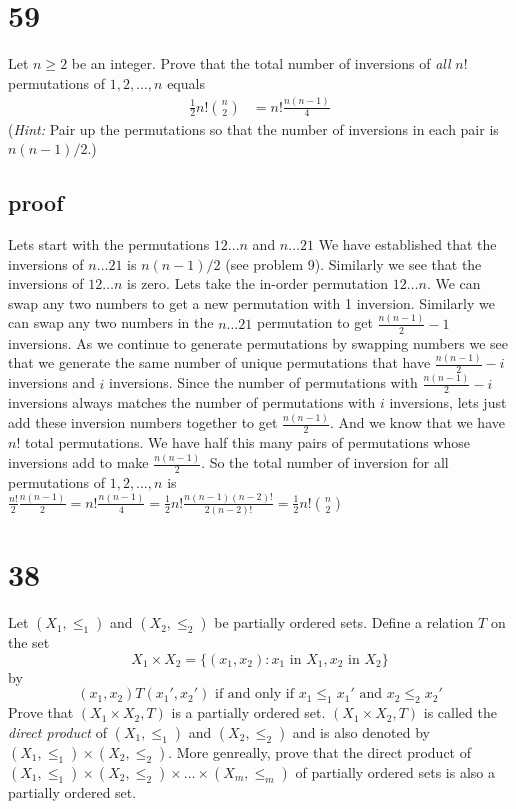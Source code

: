 \documentclass{article}
\begin{document}
\section*{59}
Let $n\geq2$ be an integer. Prove that the total number of inversions of \emph{all} $n!$ permutations of $1,2,\dots,n$ equals
\begin{align*}
  \frac{1}{2}n!\binom{n}{2}&=n!\frac{n(n-1)}{4}
\end{align*}
(\emph{Hint:} Pair up the permutations so that the number of inversions in each pair is $n(n-1)/2$.)
\subsection*{proof}
Lets start with the permutations $12\dots n$ and $n\dots21$ We have established that the inversions of $n\dots21$ is $n(n-1)/2$ (see problem 9). Similarly we see that the inversions of $12\dots n$ is zero. Lets take the in-order permutation $12\dots n$. We can swap any two numbers to get a new permutation with 1 inversion. Similarly we can swap any two numbers in the $n\dots21$ permutation to get $\frac{n(n-1)}{2}-1$ inversions. As we continue to generate permutations by swapping numbers we see that we generate the same number of unique permutations that have $\frac{n(n-1)}{2}-i$ inversions and $i$ inversions. Since the number of permutations with $\frac{n(n-1)}{2}-i$ inversions always matches the number of permutations with $i$ inversions, lets just add these inversion numbers together to get $\frac{n(n-1)}{2}$. And we know that we have $n!$ total permutations. We have half this many pairs of permutations whose inversions add to make $\frac{n(n-1)}{2}$. So the total number of inversion for all permutations of $1,2,\dots,n$ is $\frac{n!}{2}\frac{n(n-1)}{2}=n!\frac{n(n-1)}{4}=\frac{1}{2}n!\frac{n(n-1)(n-2)!}{2(n-2)!}=\frac{1}{2}n!\binom{n}{2}$
\section*{38}
 Let $(X_1, \leq_1)$ and $(X_2,\leq_2)$ be partially ordered sets. Define a relation $T$ on the set 
\[X_1\times X_2=\{(x_1,x_2):x_1 \text{ in } X_1,x_2 \text{ in } X_2\}\]
by
\[(x_1,x_2)T(x_1',x_2')\text{ if and only if } x_1\leq_1 x_1'\text{ and }x_2\leq_2x_2'\]
Prove that $(X_1\times X_2,T)$ is a partially ordered set. $(X_1\times X_2,T)$ is called the \emph{direct product} of $(X_1,\leq_1)$ and $(X_2,\leq_2)$ and is also denoted by $(X_1,\leq_1)\times(X_2,\leq_2)$. More genreally, prove that the direct product of $(X_1,\leq_1)\times(X_2,\leq_2)\times\dots\times(X_m,\leq_m)$ of partially ordered sets is also a partially ordered set.
\end{document}
